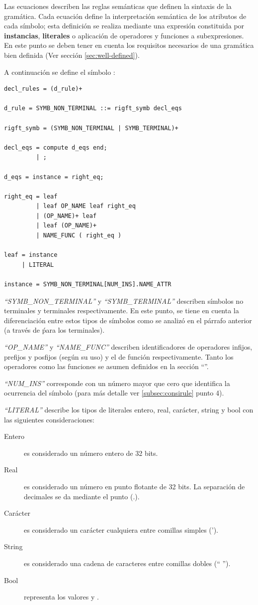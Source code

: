 Las ecuaciones describen las reglas semánticas que definen la sintaxis de la gramática. Cada ecuación define la interpretación semántica de los atributos de cada símbolo; esta definición se realiza mediante una expresión constituida por \textbf{instancias}, \textbf{literales} o aplicación de operadores y funciones a subexpresiones.
En este punto se deben tener en cuenta los requisitos necesarios de una gramática bien definida (Ver sección \ref{sec:well-defined}).

A continuación se define el símbolo :

\begin{lstlisting}[frame=shadowbox, language=specmag, linewidth=11cm]
decl_rules = (d_rule)+ 

d_rule = SYMB_NON_TERMINAL ::= rigft_symb decl_eqs

rigft_symb = (SYMB_NON_TERMINAL | SYMB_TERMINAL)+

decl_eqs = compute d_eqs end;
         | ;

d_eqs = instance = right_eq;

right_eq = leaf
         | leaf OP_NAME leaf right_eq
         | (OP_NAME)+ leaf
         | leaf (OP_NAME)+
         | NAME_FUNC ( right_eq ) 

leaf = instance
     | LITERAL

instance = SYMB_NON_TERMINAL[NUM_INS].NAME_ATTR
\end{lstlisting}

\textit{``SYMB\_NON\_TERMINAL''} y \textit{``SYMB\_TERMINAL''} describen símbolos no terminales y terminales respectivamente. En este punto, se tiene en cuenta la diferenciación entre estos tipos de símbolos como se analizó en el párrafo anterior (a través de \' para los terminales).
 
\textit{``OP\_NAME''} y  \textit{``NAME\_FUNC''} describen identificadores de operadores infijos, prefijos y posfijos (según su uso) y el de función respectivamente. Tanto los operadores como las funciones se asumen definidos en la sección ``''.

\textit{``NUM\_INS''} corresponde con un número mayor que cero que identifica la ocurrencia del símbolo (para más detalle ver \ref{subsec:consirule} punto 4).

\textit{``LITERAL''} describe los tipos de literales entero, real, carácter, string y bool con las siguientes consideraciones:

\begin{description}
\item [Entero] es considerado un número entero de 32 bits. 
\item [Real] es considerado un número en punto flotante de 32 bits. La separación de decimales se da mediante el punto (.).
\item [Carácter] es considerado un carácter cualquiera entre comillas simples (').
\item [String] es considerado una cadena de caracteres entre comillas dobles (`` '').
\item [Bool] representa los valores  y .
\end{description}

